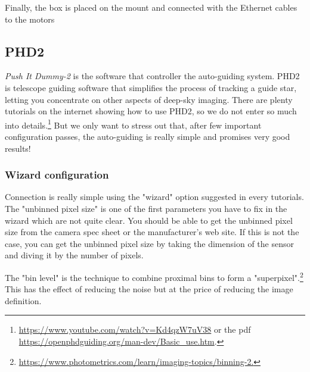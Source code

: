 \documentclass{article}
\begin{document}
\begin{multicols}{2}

        Finally, the box is placed on the mount and connected with the Ethernet cables to the motors

        \subsection{PHD2}
        \textit{Push It Dummy-2} is the software that controller the auto-guiding system.
        PHD2 is telescope guiding software that simplifies the process of tracking a guide star, letting you concentrate on other aspects of deep-sky imaging.
        There are plenty tutorials on the internet showing how to use PHD2, so we do not enter so much into details.\footnote{\url{https://www.youtube.com/watch?v=Kd4qzW7uV38} or the pdf \url{https://openphdguiding.org/man-dev/Basic_use.htm}.}
        But we only want to stress out that, after few important configuration passes, the auto-guiding is really simple and promises very good results!

        \subsubsection{Wizard configuration}
        Connection is really simple using the "wizard" option suggested in every tutorials.
        The "unbinned pixel size" is one of the first parameters you have to fix in the wizard which are not quite clear.
        You should be able to get the unbinned pixel size from the camera spec sheet or the manufacturer's web site.
        If this is not the case, you can get the unbinned pixel size by taking the dimension of the sensor and diving it by the number of pixels.

        The "bin level" is the technique to combine proximal bins to form a "superpixel".\footnote{\url{https://www.photometrics.com/learn/imaging-topics/binning-2.}}
        This has the effect of reducing the noise but at the price of reducing the image definition.


\end{multicols}
\end{document}
